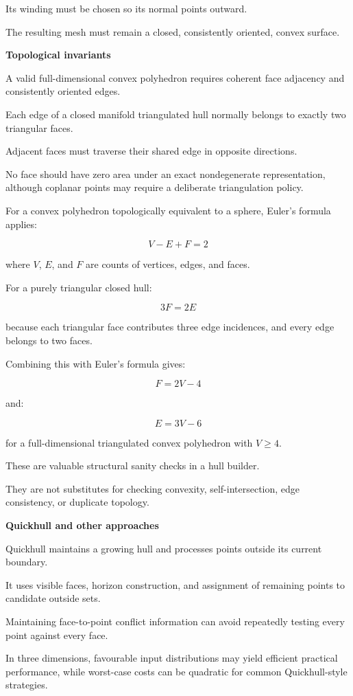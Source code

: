 Its winding must be chosen so its normal points outward.

The resulting mesh must remain a closed, consistently oriented, convex surface.

\textbf{Topological invariants}

A valid full-dimensional convex polyhedron requires coherent face adjacency and consistently oriented edges.

Each edge of a closed manifold triangulated hull normally belongs to exactly two triangular faces.

Adjacent faces must traverse their shared edge in opposite directions.

No face should have zero area under an exact nondegenerate representation, although coplanar points may require a deliberate triangulation policy.

For a convex polyhedron topologically equivalent to a sphere, Euler's formula applies:

\[
\boxed{V-E+F=2}
\]

where \(V\), \(E\), and \(F\) are counts of vertices, edges, and faces.

For a purely triangular closed hull:

\[
3F=2E
\]

because each triangular face contributes three edge incidences, and every edge belongs to two faces.

Combining this with Euler's formula gives:

\[
\boxed{F=2V-4}
\]

and:

\[
\boxed{E=3V-6}
\]

for a full-dimensional triangulated convex polyhedron with \(V\ge4\).

These are valuable structural sanity checks in a hull builder.

They are not substitutes for checking convexity, self-intersection, edge consistency, or duplicate topology.

\textbf{Quickhull and other approaches}

Quickhull maintains a growing hull and processes points outside its current boundary.

It uses visible faces, horizon construction, and assignment of remaining points to candidate outside sets.

Maintaining face-to-point conflict information can avoid repeatedly testing every point against every face.

In three dimensions, favourable input distributions may yield efficient practical performance, while worst-case costs can be quadratic for common Quickhull-style strategies.

